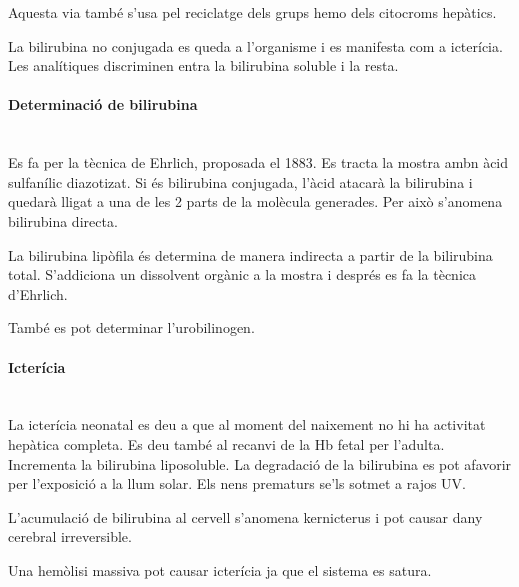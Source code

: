 Aquesta via també s'usa pel reciclatge dels grups hemo dels citocroms
hepàtics.

La bilirubina no conjugada es queda a l'organisme i es manifesta com a
icterícia. Les analítiques discriminen entra la bilirubina soluble i
la resta.

\paragraph{Determinació de bilirubina} \hfill \\
Es fa per la tècnica de Ehrlich, proposada el 1883. Es tracta la
mostra ambn àcid sulfanílic diazotizat. Si és bilirubina conjugada,
l'àcid atacarà la bilirubina i quedarà lligat a una de les 2 parts de
la molècula generades. Per això s'anomena bilirubina directa.

La bilirubina lipòfila és determina de manera indirecta a partir de la
bilirubina total. S'addiciona un dissolvent orgànic a la mostra i
després es fa la tècnica d'Ehrlich.

També es pot determinar l'urobilinogen.

\paragraph{Icterícia} \hfill \\
La icterícia neonatal es deu a que al moment del naixement no hi ha
activitat hepàtica completa. Es deu també al recanvi de la Hb fetal
per l'adulta. Incrementa la bilirubina liposoluble. La degradació de
la bilirubina es pot afavorir per l'exposició a la llum solar. Els
nens prematurs se'ls sotmet a rajos UV.

L'acumulació de bilirubina al cervell s'anomena kernicterus i pot
causar dany cerebral irreversible.

Una hemòlisi massiva pot causar icterícia ja que el sistema es satura.


